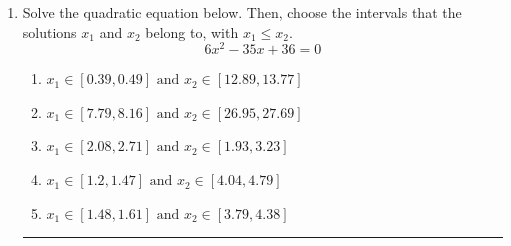 \documentclass[14pt]{extbook}
\newcommand{\litem}[1]{\item#1\hspace*{-1cm}\rule{\textwidth}{0.4pt}}
\begin{document}
\begin{enumerate}
{\begin{enumerate}[label=\Alph*.]
\end{enumerate} }
\litem{
Solve the quadratic equation below. Then, choose the intervals that the solutions $x_1$ and $x_2$ belong to, with $x_1 \leq x_2$.\[ 6x^{2} -35 x + 36 = 0 \]\begin{enumerate}[label=\Alph*.]
\item \( x_1 \in [0.39, 0.49] \text{ and } x_2 \in [12.89, 13.77] \)
\item \( x_1 \in [7.79, 8.16] \text{ and } x_2 \in [26.95, 27.69] \)
\item \( x_1 \in [2.08, 2.71] \text{ and } x_2 \in [1.93, 3.23] \)
\item \( x_1 \in [1.2, 1.47] \text{ and } x_2 \in [4.04, 4.79] \)
\item \( x_1 \in [1.48, 1.61] \text{ and } x_2 \in [3.79, 4.38] \)

\end{enumerate} }
\end{enumerate}
\end{document}
